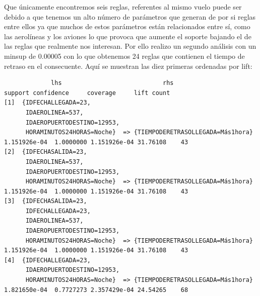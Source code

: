 \documentclass{article}
\begin{document}
Que únicamente encontremos seis reglas, referentes al mismo vuelo puede ser debido a que tenemos un alto número de parámetros que generan de por si reglas entre ellos ya que muchos de estos parámetros están relacionados entre sí, como las aerolíneas y los aviones lo que provoca que aumente el soporte bajando el de las reglas que realmente nos interesan. Por ello realizo un segundo análisis con un minsup de 0.00005 con lo que obtenemos 24 reglas que contienen el tiempo de retraso en el consecuente. Aquí se muestran las diez primeras ordenadas por lift:
\begin{lstlisting}
             lhs                            rhs                                    support confidence     coverage     lift count
[1]  {IDFECHALLEGADA=23,                                                                                                 
      IDAEROLINEA=537,                                                                                                   
      IDAEROPUERTODESTINO=12953,                                                                                         
      HORAMINUTOS24HORAS=Noche}  => {TIEMPODERETRASOLLEGADA=Más1hora} 1.151926e-04  1.0000000 1.151926e-04 31.76108    43
[2]  {IDFECHASALIDA=23,                                                                                                  
      IDAEROLINEA=537,                                                                                                   
      IDAEROPUERTODESTINO=12953,                                                                                         
      HORAMINUTOS24HORAS=Noche}  => {TIEMPODERETRASOLLEGADA=Más1hora} 1.151926e-04  1.0000000 1.151926e-04 31.76108    43
[3]  {IDFECHASALIDA=23,                                                                                                  
      IDFECHALLEGADA=23,                                                                                                 
      IDAEROLINEA=537,                                                                                                   
      IDAEROPUERTODESTINO=12953,                                                                                         
      HORAMINUTOS24HORAS=Noche}  => {TIEMPODERETRASOLLEGADA=Más1hora} 1.151926e-04  1.0000000 1.151926e-04 31.76108    43
[4]  {IDFECHALLEGADA=23,                                                                                                 
      IDAEROPUERTODESTINO=12953,                                                                                         
      HORAMINUTOS24HORAS=Noche}  => {TIEMPODERETRASOLLEGADA=Más1hora} 1.821650e-04  0.7727273 2.357429e-04 24.54265    68

\end{lstlisting}
\end{document}
